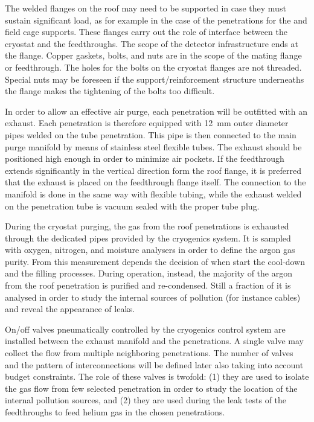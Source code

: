 The welded flanges on the roof may need to be supported in case they must sustain significant load, as for example in the case of the penetrations for the  and field cage supports.
These flanges carry out the role of interface between the cryostat and the feedthroughs.
The scope of the detector infrastructure ends at the flange.
Copper gaskets, bolts, and nuts are in the scope of the mating flange or feedthrough.
The holes for the bolts on the cryostat flanges are not threaded.
Special nuts may be foreseen if the support/reinforcement structure underneaths the flange makes the tightening of the bolts too difficult.

In order to allow an effective air purge, each penetration will be outfitted with an exhaust. Each penetration is therefore equipped with 12~mm outer diameter pipes welded on the tube penetration.
This pipe is then connected to the main purge manifold by means of stainless steel flexible tubes.
The exhaust should be positioned high enough in order to minimize air pockets.
If the feedthrough extends significantly in the vertical direction form the roof flange, it is preferred that the exhaust is placed on the feedthrough flange itself.
The connection to the manifold is done in the same way with flexible tubing, while the exhaust welded on the penetration tube is vacuum sealed with the proper tube plug.

During the cryostat purging, the gas from the roof penetrations is exhausted through the dedicated pipes provided by the cryogenics system.
It is sampled with oxygen, nitrogen, and moisture analysers in order to define the argon gas purity.
From this measurement depends the decision of when start the cool-down and the filling processes.
During operation, instead, the majority of the argon from the roof penetration is purified and re-condensed.
Still a fraction of it is analysed in order to study the internal sources of pollution (for instance cables) and reveal the appearance of leaks.

On/off valves pneumatically controlled by the cryogenics control system are installed between the exhaust manifold and the penetrations.
A single valve may collect the flow from multiple neighboring penetrations.
The number of valves and the pattern of interconnections will be defined later also taking into account budget constraints.
The role of these valves is twofold: (1) they are used to isolate the gas flow from few selected penetration in order to study the location of the internal pollution sources, and (2) they are used during the leak tests of the feedthroughs to feed helium gas in the chosen penetrations.

